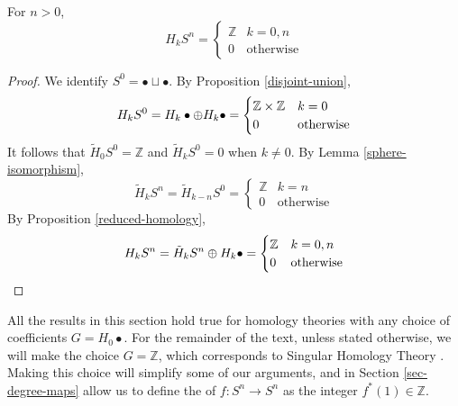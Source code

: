 \begin{prop}\label{homology-spheres}
For $n>0$,
$$H_kS^n=\begin{cases}\mathbb{Z}&k=0,n \\ 0 & \text{otherwise}\end{cases}$$
\end{prop}
\begin{proof}
We identify $S^{0}=\bullet \sqcup \bullet$. By Proposition \ref{disjoint-union}, $$H_k S^{0}=H_k\bullet \oplus H_k \bullet=\begin{cases}\mathbb{Z}\times \mathbb{Z} &k=0\\ 0 & \text{otherwise}\end{cases}$$ It follows that $\tilde{H}_0S^{0}=\mathbb{Z}$ and $\tilde{H}_kS^{0}=0$ when $k\neq 0$. By Lemma \ref{sphere-isomorphism}, $$\tilde{H}_kS^n=\tilde{H}_{k-n}S^{0}=\begin{cases}\mathbb{Z} & k=n\\0 & \text{otherwise}\end{cases}$$
By Proposition \ref{reduced-homology}, $$H_kS^n=\tilde{H}_kS^n\oplus H_k\bullet=\begin{cases}\mathbb{Z}&k=0,n \\ 0 & \text{otherwise}\end{cases}$$
\cite{Werndli}
\end{proof}

All the results in this section hold true for homology theories with any choice of coefficients $G=H_0\bullet$. For the remainder of the text, unless stated otherwise, we will make the choice $G=\mathbb{Z}$, which corresponds to Singular Homology Theory \cite{Hatcher}. Making this choice will simplify some of our arguments, and in Section \ref{sec-degree-maps} allow us to define the  of $f:S^n\rightarrow S^n$ as the integer $f^*(1)\in\mathbb{Z}$.